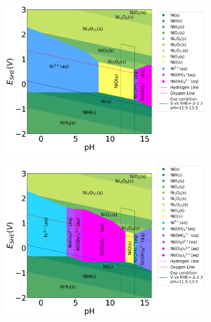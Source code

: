 \documentclass[journal=jacsat,manuscript=article]{achemso}
\begin{document}
\begin{figure}[htbp]
    \centering
    \begin{subfigure}[b]{0.3\textwidth}
        \subcaption{}\label{fig:Ni_Pourbaix_H2O}
        \includegraphics[width=\textwidth]{Figures/pourbaix_diagrams/Ni-NH3-H2O_activity=1e-04_[NH3]=0M_[Gly]=0M_[CN]=0.png}
        \par\medskip
    \end{subfigure}
    \begin{subfigure}[b]{0.3\textwidth}
        \subcaption{}\label{fig:Ni_Pourbaix_NH3_Gly}
        \includegraphics[width=\textwidth]{Figures/pourbaix_diagrams/Ni-NH3-H2O_activity=1e-04_[NH3]=0.02M_[Gly]=0.005M_[CN]=0.png}

\end{subfigure}
\end{figure}
\end{document}
